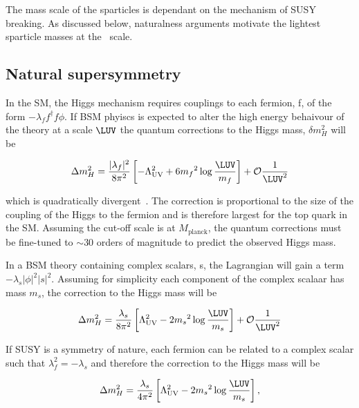 The mass scale of the sparticles is dependant on the mechanism of SUSY breaking.
As discussed below, naturalness arguments motivate the lightest sparticle masses 
at the \TeV~scale.

\subsection{Natural supersymmetry}
\label{sec:natSUSY}
In the SM, the Higgs mechanism requires couplings to each fermion, f, of the form $-\lambda_{f}f^{\dagger}f\phi$. If BSM phyiscs
is expected to alter the high energy behaivour of the theory at a scale $\LUV$ the quantum corrections 
to the Higgs mass, $\delta m^2_{H}$ will be 

\begin{equation}
\Delta m^2_H =  \frac{|\lambda_f|^2}{8\pi^2}\left[-\Lambda^2_{\text{UV}} + 6 {m_f}^2\log\frac{\LUV}{m_f}\right] + \mathcal{O}\frac{1}{\LUV^2}
\end{equation}

which is quadratically divergent~\cite{HMSSM}. The correction is proportional to the size of the coupling of the Higgs to the fermion 
and is therefore largest for the top quark in the SM. Assuming the cut-off scale is at $M_{\text{planck}}$, the quantum 
corrections must be fine-tuned to $\sim 30$ orders of magnitude to predict the observed Higgs mass. 

In a BSM theory containing complex scalars, s, the Lagrangian will gain a term $-\lambda_{s}|\phi|^2|s|^2$.
Assuming for simplicity each component of the complex scalaar has mass $m_s$, the correction to the Higgs mass will be

\begin{equation}
\Delta m^2_H =  \frac{\lambda_s}{8\pi^2}\left[\Lambda^2_{\text{UV}} - 2 {m_s}^2\log\frac{\LUV}{m_s}\right] + \mathcal{O}\frac{1}{\LUV^2}
\end{equation}

If SUSY is a symmetry of nature, each fermion can be related to a complex scalar such that $\lambda_f^2 = -\lambda_s$ 
and therefore the correction to the Higgs mass will be 

\begin{equation}
\label{equ:corrHiggsSusy}
\Delta m^2_H =  \frac{\lambda_s}{4\pi^2}\left[\Lambda^2_{\text{UV}} - 2 {m_s}^2\log\frac{\LUV}{m_s}\right],
\end{equation}

